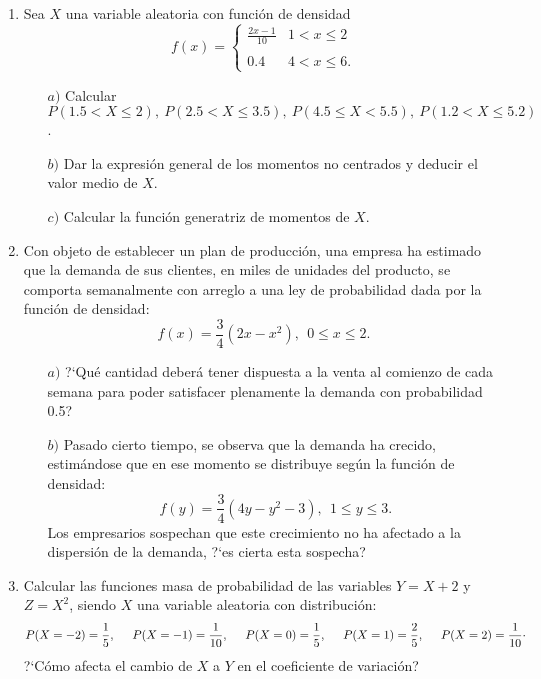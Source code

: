 \documentclass[11pt]{book}
\begin{document}
\begin{enumerate}
\vskip 0.75cm  \item  Sea $X$  una variable aleatoria  con funci{\'o}n de densidad
     $$
     f(x) = \left \{
     \begin{array}{lc}
       \displaystyle{\frac{2x-1}{10}} & 1<x \leq 2 \\
       \ & \ \\
       \displaystyle{0\mbox{.}4} & 4 < x \leq 6.
       \end{array}
     \right.
     $$
    \begin{enumerate}\item [$a)$] Calcular \ $P(1\mbox{.}5 < X \leq 2) ,\  P(2\mbox{.}5<X \leq 3\mbox{.}5) ,\
    P(4\mbox{.}5 \leq X < 5\mbox{.}5) ,\  P(1\mbox{.}2 < X \leq
     5\mbox{.}2)$.
     \item [$b)$] Dar la expresi{\'o}n general de los momentos no centrados y deducir el valor  medio de $X$.
     \item [$c)$] Calcular la funci{\'o}n generatriz de momentos de $X$.
     \end{enumerate}

\vskip 0.75cm   \item  Con objeto de establecer un plan de producci{\'o}n,  una
empresa  ha estimado que la demanda de sus clientes, en miles de unidades del
producto,  se comporta  semanalmente  con arreglo a una ley de probabilidad
dada por la funci{\'o}n de densidad:
     $$
     f(x) =
       \displaystyle{\frac{3}{4} (2x - x^{2})}, \  \ 0 \leq x \leq 2.
     $$
\begin{enumerate}\item [$a)$] ?`Qu{\'e}  cantidad  deber{\'a} tener dispuesta a la venta al comienzo  de  cada  semana para poder
satisfacer plenamente la demanda con probabilidad 0.5?
     \item [$b)$] Pasado cierto tiempo, se observa  que la demanda ha crecido,   estim{\'a}ndose que en
     ese momento se
     distribuye seg{\'u}n la  funci{\'o}n de densidad:
      $$
     f(y) =  \displaystyle{\frac{3}{4} (4y - y^{2}-3)},  \ \ 1 \leq y \leq 3.
     $$
Los empresarios  sospechan que este crecimiento no ha afectado  a la dispersi{\'o}n
de la demanda, ?`es cierta esta sospecha?
\end{enumerate}

\vskip 0.75cm \item  Calcular las funciones masa de probabilidad de las
variables $Y = X + 2$ y $Z = X^{2}$, siendo $X$ una variable aleatoria  con
distribuci{\'o}n:
  $$
P(X=-2)= \displaystyle\frac{1}{5}, \hskip 0.5cm P(X=-1)=
\displaystyle\frac{1}{10}, \hskip 0.5cm P(X=0)= \displaystyle\frac{1}{5},
\hskip 0.5cm P(X=1)= \displaystyle\frac{2}{5}, \hskip 0.5cm P(X=2)=
\displaystyle\frac{1}{10}\cdot
$$
?`C{\'o}mo afecta el cambio de $X$ a $Y$ en el coeficiente de variaci{\'o}n?


\end{enumerate}
\end{document}
